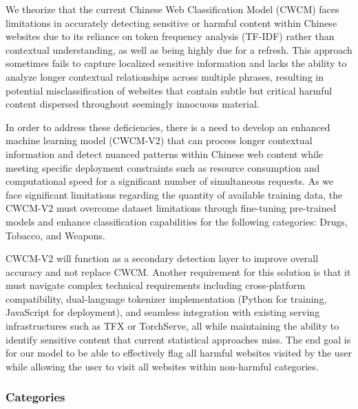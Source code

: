 \documentclass[
  titlepage]{article}
\begin{document}
We theorize that the current Chinese Web Classification Model (CWCM)
faces limitations in accurately detecting sensitive or harmful content
within Chinese websites due to its reliance on token frequency analysis
(TF-IDF) rather than contextual understanding, as well as being highly
due for a refresh. This approach sometimes fails to capture localized
sensitive information and lacks the ability to analyze longer contextual
relationships across multiple phrases, resulting in potential
misclassification of websites that contain subtle but critical harmful
content dispersed throughout seemingly innocuous material.

In order to address these deficiencies, there is a need to develop an
enhanced machine learning model (CWCM-V2) that can process longer
contextual information and detect nuanced patterns within Chinese web
content while meeting specific deployment constraints such as resource
consumption and computational speed for a significant number of
simultaneous requests. As we face significant limitations regarding the
quantity of available training data, the CWCM-V2 must overcome dataset
limitations through fine-tuning pre-trained models and enhance
classification capabilities for the following categories: Drugs,
Tobacco, and Weapons.

CWCM-V2 will function as a secondary detection layer to improve overall
accuracy and not replace CWCM. Another requirement for this solution is
that it must navigate complex technical requirements including
cross-platform compatibility, dual-language tokenizer implementation
(Python for training, JavaScript for deployment), and seamless
integration with existing serving infrastructures such as TFX or
TorchServe, all while maintaining the ability to identify sensitive
content that current statistical approaches miss. The end goal is for
our model to be able to effectively flag all harmful websites visited by
the user while allowing the user to visit all websites within
non-harmful categories.

\subsubsection{Categories}\label{categories}
\end{document}
